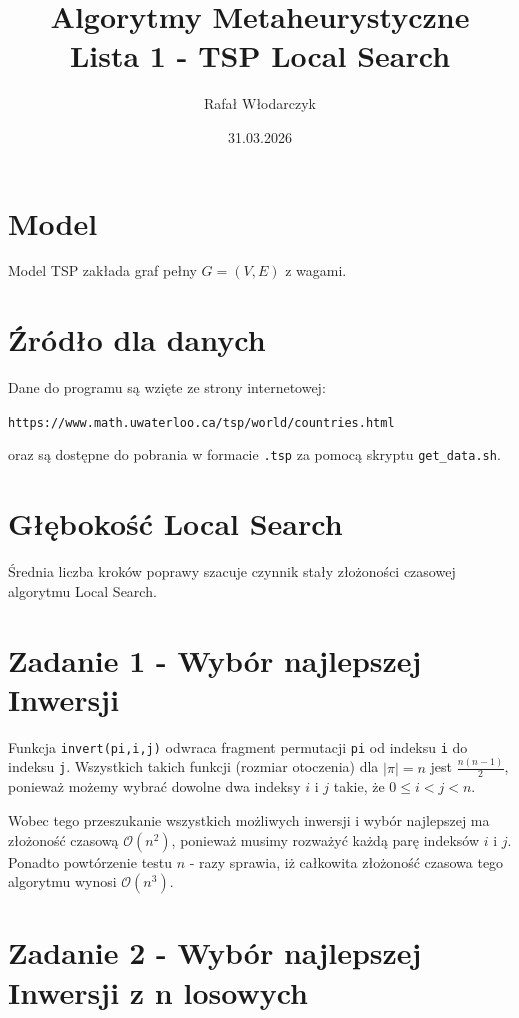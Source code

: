 \documentclass{article}
\title{Algorytmy Metaheurystyczne\\Lista 1 - TSP Local Search}
\author{Rafał Włodarczyk}
\date{31.03.2026}
\begin{document}
\maketitle

\tableofcontents

\section{Model}

Model TSP zakłada graf pełny $G=(V,E)$ z wagami.

\section{Źródło dla danych}

Dane do programu są wzięte ze strony internetowej:
\begin{center}
\texttt{https://www.math.uwaterloo.ca/tsp/world/countries.html}
\end{center}
oraz są dostępne do pobrania w formacie \texttt{.tsp} za pomocą skryptu \texttt{get\_data.sh}.

\section{Głębokość Local Search}

Średnia liczba kroków poprawy szacuje czynnik stały złożoności czasowej algorytmu Local Search.

\section{Zadanie 1 - Wybór najlepszej Inwersji}

Funkcja \texttt{invert(pi,i,j)} odwraca fragment permutacji \texttt{pi} od indeksu \texttt{i} do indeksu \texttt{j}.
Wszystkich takich funkcji (rozmiar otoczenia) dla $|\pi| = n$ jest $\frac{n(n-1)}{2}$, ponieważ możemy wybrać dowolne dwa indeksy $i$ i $j$ takie, że $0 \leq i < j < n$.

Wobec tego przeszukanie wszystkich możliwych inwersji i wybór najlepszej ma złożoność czasową $\mathcal{O}(n^2)$, ponieważ musimy rozważyć każdą parę indeksów $i$ i $j$.
Ponadto powtórzenie testu $n$ - razy sprawia, iż całkowita złożoność czasowa tego algorytmu wynosi $\mathcal{O}(n^3)$.



\section{Zadanie 2 - Wybór najlepszej Inwersji z n losowych}
\end{document}
